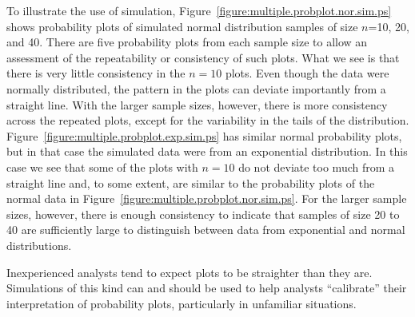 \begin{sidewaysfigure}
\caption{Simulated normal data on normal probability plots.
Five replications for each sample size.}
\label{figure:multiple.probplot.nor.sim.ps}
\end{sidewaysfigure}
\begin{sidewaysfigure}
\caption{Simulated exponential data plotted on normal probability plots.
Five replications for each sample size.}
\label{figure:multiple.probplot.exp.sim.ps}
\end{sidewaysfigure}
To illustrate the use of simulation,
Figure~\ref{figure:multiple.probplot.nor.sim.ps} shows 
probability plots of simulated normal distribution samples 
of size $n$=10, 20, and 40.
There are five probability plots
from each sample size to allow an assessment of the repeatability or
consistency of such plots. What we see is that
there is very little consistency in the $n=10$ plots. Even though the
data were normally distributed, the pattern in the plots can deviate
importantly from a straight line. With the larger sample sizes,
however, there is more consistency across the repeated plots, except for
the variability in the tails of the distribution. 
Figure~\ref{figure:multiple.probplot.exp.sim.ps} has similar
normal probability plots, but in that case the
simulated data were from an exponential distribution.
In this case we see that some of the plots with $n=10$ do not
deviate too much from a straight line and, to some extent,
are similar to the probability plots of the normal data in
Figure~\ref{figure:multiple.probplot.nor.sim.ps}. For the larger sample
sizes, however, there is enough consistency to indicate that samples
of size 20 to 40 are sufficiently large to distinguish between
data  from exponential and normal distributions.

Inexperienced analysts tend to expect plots to be straighter than
they are.  Simulations of this kind can and should be used to help
analysts ``calibrate'' their interpretation of probability plots,
particularly in unfamiliar situations.

